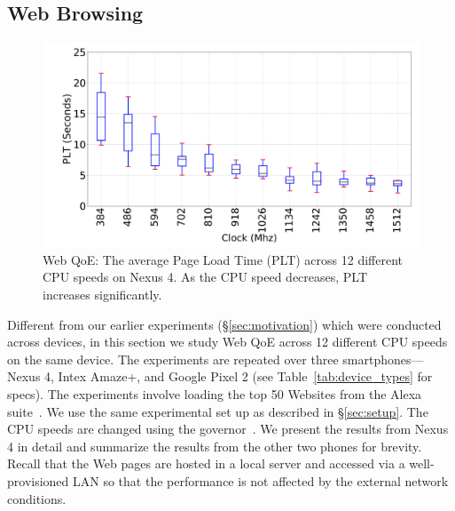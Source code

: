 
\subsection{Web Browsing} \label{label:web}
\begin{figure}[t]
  \centering
  \includegraphics[width=0.9\linewidth]{sections/device-work/plt-clock}
    \caption{Web QoE: The average Page Load Time (PLT) across 12 different CPU speeds on Nexus 4. As the CPU speed decreases, PLT increases significantly. }
  \label{fig:plt_clock}
\end{figure}


Different from our earlier experiments (\S\ref{sec:motivation}) which were conducted across devices, in this section we study Web QoE  across 12 different CPU speeds on the same device. The experiments are repeated over three smartphones---Nexus 4, Intex Amaze+, and Google Pixel 2 (see Table~\ref{tab:device_types} for specs). The experiments involve loading the top 50 Websites from the Alexa suite~\cite{alexa}.  We use the 
same experimental set up as described in \S\ref{sec:setup}. The CPU speeds are changed using the governor~\cite{ad-governors}. We present the results from Nexus\,4 in detail and summarize the results from the other two phones for brevity.
%
Recall that the Web pages are hosted in a local server and accessed via a well-provisioned LAN so that the performance is not affected by the external network conditions. 


